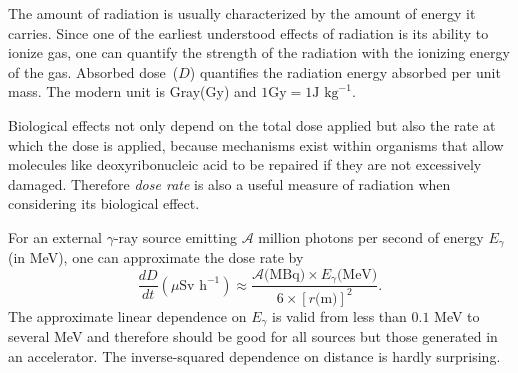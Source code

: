 \documentclass[nofootinbib,preprint,aip,pra]{revtex4-1}
\begin{document}
        The amount of radiation is usually characterized by the amount of energy it carries. Since one of
        the earliest understood effects of radiation is its ability to ionize gas, one can quantify the
        strength of the radiation with the ionizing energy of the gas.
        Absorbed dose~($D$) quantifies the 
        radiation energy absorbed per unit mass. The modern unit is Gray(Gy)
        and $1\text{Gy}=1\text{J kg}^{-1}$.\cite{u16}

        Biological effects not only depend on the total dose applied but also the rate at which the 
        dose is applied, because mechanisms exist within organisms that allow molecules like deoxyribonucleic acid
        to be repaired if they are not excessively damaged. Therefore {\it dose rate} is also a useful
        measure of radiation when considering its biological effect.

        For an external $\gamma$-ray source emitting $\mathcal{A}$ million photons per second 
        of energy $E_{\gamma}$
        (in MeV), one can approximate the dose rate by 
        \begin{equation}
            \frac{dD}{dt}(\mu\text{Sv h}^{-1}) \approx \frac{\mathcal{A}\text{(MBq)}\times E_{\gamma}\text{(MeV)}}
            {6\times [r\text{(m)}]^2}.
        \end{equation}
        The approximate linear dependence on $E_{\gamma}$ is valid from less than $0.1$ MeV to several
        MeV and therefore should be good for all sources but those generated in an accelerator.\cite{my68}
        The inverse-squared dependence on distance is hardly surprising.
\end{document}
